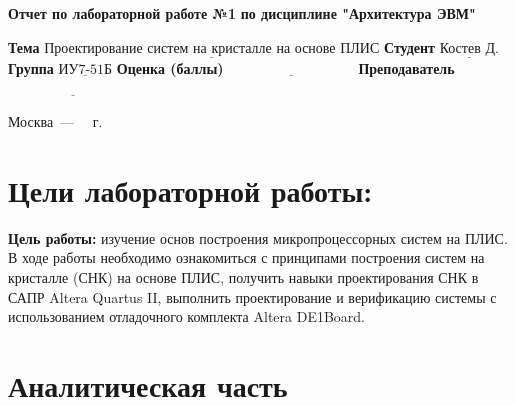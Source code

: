 \documentclass[12pt]{report}
\begin{document}
\begin{titlepage}
	
	\begin{center}
		\noindent\begin{minipage}{1.3\textwidth}\centering
			\Large\textbf{Отчет по лабораторной работе №1}\newline
			\textbf{по дисциплине "Архитектура ЭВМ"}\newline\newline
		\end{minipage}
	\end{center}
	
	\noindent\textbf{Тема} $\underline{\text{Проектирование систем на кристалле на основе ПЛИС}}$\newline\newline
	\noindent\textbf{Студент} $\underline{\text{Костев Д.}}$\newline\newline
	\noindent\textbf{Группа} $\underline{\text{ИУ7-51Б}}$\newline\newline
	\noindent\textbf{Оценка (баллы)} $\underline{\text{~~~~~~~~~~~~~~~~~~~~~~~~~~~}}$\newline\newline
	\noindent\textbf{Преподаватель} $\underline{\text{~~~~~~~~~~~~~~~~~~~~~~~~~~~ }}$\newline\newline\newline
	
	\begin{center}
		\vfill
		Москва~---~\the\year
		~г.
	\end{center}
\end{titlepage}


\tableofcontents

\newpage
\chapter{Цели лабораторной работы: }
\textbf{Цель работы:} изучение основ построения микропроцессорных систем на ПЛИС. В ходе работы необходимо ознакомиться с принципами построения систем на кристалле (СНК) на основе ПЛИС, получить навыки проектирования СНК в САПР Altera Quartus II, выполнить проектирование и верификацию системы с использованием отладочного комплекта Altera DE1Board.
	
\clearpage

\chapter{Аналитическая часть}
\end{document}
